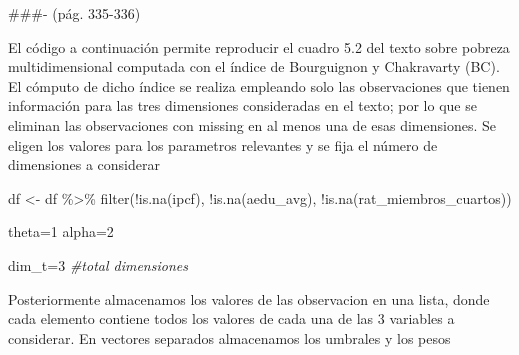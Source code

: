 \documentclass[
]{book}
\newenvironment{Shaded}{\begin{snugshade}}{\end{snugshade}}
\newcommand{\CommentTok}[1]{\textcolor[rgb]{0.56,0.35,0.01}{\textit{#1}}}
\newcommand{\DecValTok}[1]{\textcolor[rgb]{0.00,0.00,0.81}{#1}}
\newcommand{\FloatTok}[1]{\textcolor[rgb]{0.00,0.00,0.81}{#1}}
\newcommand{\FunctionTok}[1]{\textcolor[rgb]{0.00,0.00,0.00}{#1}}
\newcommand{\NormalTok}[1]{#1}
\newcommand{\OtherTok}[1]{\textcolor[rgb]{0.56,0.35,0.01}{#1}}
\newcommand{\SpecialCharTok}[1]{\textcolor[rgb]{0.00,0.00,0.00}{#1}}
\begin{document}
\#\#\#- (pág. 335-336)

El código a continuación permite reproducir el cuadro 5.2 del texto sobre pobreza multidimensional computada con el índice de Bourguignon y Chakravarty (BC). El cómputo de dicho índice se realiza empleando solo las observaciones que tienen información para las tres dimensiones consideradas en el texto; por lo que se eliminan las observaciones con missing en al menos una de esas dimensiones. Se eligen los valores para los parametros relevantes y se fija el número de dimensiones a considerar

\begin{Shaded}
\begin{Highlighting}[]
\NormalTok{df }\OtherTok{\textless{}{-}}\NormalTok{ df }\SpecialCharTok{\%\textgreater{}\%} \FunctionTok{filter}\NormalTok{(}\SpecialCharTok{!}\FunctionTok{is.na}\NormalTok{(ipcf), }\SpecialCharTok{!}\FunctionTok{is.na}\NormalTok{(aedu\_avg), }\SpecialCharTok{!}\FunctionTok{is.na}\NormalTok{(rat\_miembros\_cuartos))}

\NormalTok{theta}\OtherTok{=}\DecValTok{1}  
\NormalTok{alpha}\OtherTok{=}\DecValTok{2}

\NormalTok{dim\_t}\OtherTok{=}\DecValTok{3}    \CommentTok{\#total dimensiones}
\end{Highlighting}
\end{Shaded}

Posteriormente almacenamos los valores de las observacion en una lista, donde cada elemento contiene todos los valores de cada una de las 3 variables a considerar. En vectores separados almacenamos los umbrales y los pesos

\begin{Shaded}
\end{Shaded}
\end{document}
